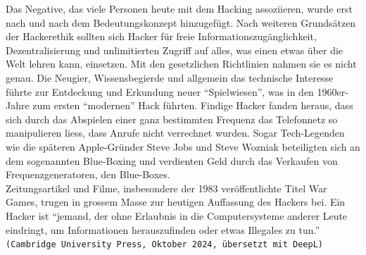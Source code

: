 \documentclass[11pt, a4paper]{article}
\begin{document}
Das Negative, das viele Personen heute mit dem Hacking assoziieren, wurde erst nach und nach dem Bedeutungskonzept hinzugefügt. Nach weiteren Grundsätzen der Hackerethik sollten sich Hacker für freie Informationszugänglichkeit, Dezentralisierung und unlimitierten Zugriff auf alles, was einen etwas über die Welt lehren kann, einsetzen. Mit den gesetzlichen Richtlinien nahmen sie es nicht genau. Die Neugier, Wissensbegierde und allgemein das technische Interesse führte zur Entdeckung und Erkundung neuer ``Spielwiesen'', was in den 1960er-Jahre zum ersten ``modernen'' Hack führten. Findige Hacker fanden heraus, dass sich durch das Abspielen einer ganz bestimmten Frequenz das Telefonnetz so manipulieren liess, dass Anrufe nicht verrechnet wurden. Sogar Tech-Legenden wie die späteren Apple-Gründer Steve Jobs und Steve Wozniak beteiligten sich an dem sogenannten Blue-Boxing und verdienten Geld durch das Verkaufen von Frequenzgeneratoren, den Blue-Boxes. \\Zeitungsartikel und Filme, insbesondere der 1983 veröffentlichte Titel War Games, trugen in grossem Masse zur heutigen Auffassung des Hackers bei.  Ein Hacker ist ``jemand, der ohne Erlaubnis in die Computersysteme anderer Leute eindringt, um Informationen herauszufinden oder etwas Illegales zu tun.'' \texttt{(Cambridge University Press, Oktober 2024, übersetzt mit DeepL)} \cite{bpbKleineGeschichte:online, CambridgeHacker:online}
\end{document}
